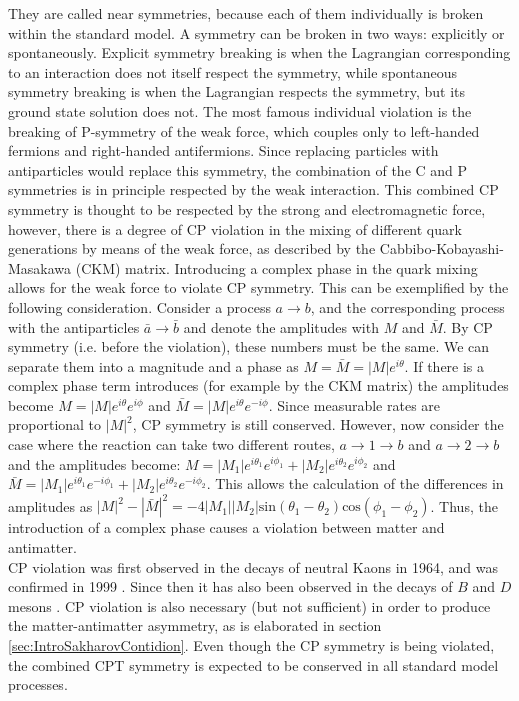 They are called near symmetries, because each of them individually is broken within the standard model. A symmetry can be broken in two ways: explicitly or spontaneously. Explicit symmetry breaking is when the Lagrangian corresponding to an interaction does not itself respect the symmetry, while spontaneous symmetry breaking is when the Lagrangian respects the symmetry, but its ground state solution does not. The most famous individual violation is the breaking of P-symmetry of the weak force, which couples only to left-handed fermions and right-handed antifermions. Since replacing particles with antiparticles would replace this symmetry, the combination of the C and P symmetries is in principle respected by the weak interaction. This combined CP symmetry is thought to be respected by the strong and electromagnetic force, however, there is a degree of CP violation in the mixing of different quark generations by means of the weak force, as described by the Cabbibo-Kobayashi-Masakawa (CKM) matrix. Introducing a complex phase in the quark mixing allows for the weak force to violate CP symmetry. This can be exemplified by the following consideration. Consider a process $a \rightarrow b$, and the corresponding process with the antiparticles $\bar{a} \rightarrow \bar{b}$ and denote the amplitudes with $M$ and $\bar{M}$. By CP symmetry (i.e. before the violation), these numbers must be the same. We can separate them into a magnitude and a phase as $M = \bar{M} = |M|e^{i\theta}$. If there is a complex phase term introduces (for example by the CKM matrix) the amplitudes become $M = |M|e^{i\theta}e^{i\phi}$ and $\bar{M} = |M|e^{i\theta}e^{-i\phi}$. Since measurable rates are proportional to $|M|^2$, CP symmetry is still conserved. However, now consider the case where the reaction can take two different routes, $a \rightarrow 1 \rightarrow b$ and $a \rightarrow 2 \rightarrow b$ and the amplitudes become: $M = |M_1|e^{i\theta_1}e^{i\phi_1} + |M_2|e^{i\theta_2}e^{i\phi_2}$ and $\bar{M} = |M_1|e^{i\theta_1}e^{-i\phi_1} + |M_2|e^{i\theta_2}e^{-i\phi_2}$. This allows the calculation of the differences in amplitudes as $|M|^2 - |\bar{M}|^2 = -4|M_1||M_2|\mathrm{sin}(\theta_1 - \theta_2)\mathrm{cos}(\phi_1 - \phi_2)$. Thus, the introduction of a complex phase causes a violation between matter and antimatter. \\
CP violation was first observed in the decays of neutral Kaons\cite{CP_violations_early} in 1964, and was confirmed in 1999 \cite{CP_violations_proof}. Since then it has also been observed in the decays of $B$ and $D$ mesons \cite{CP_violation_B, CP_violation_D}. CP violation is also necessary (but not sufficient) in order to produce the matter-antimatter asymmetry, as is elaborated in section \ref{sec:IntroSakharovContidion}. Even though the CP symmetry is being violated, the combined CPT symmetry is expected to be conserved in all standard model processes\cite{}. 

